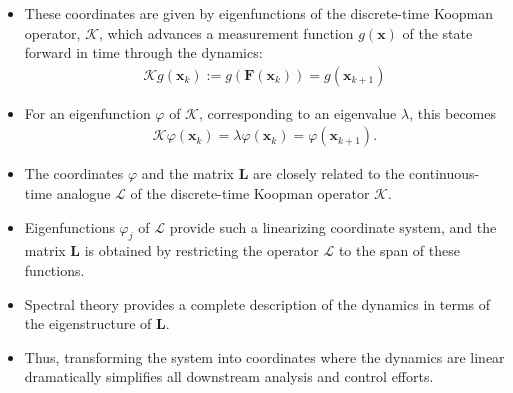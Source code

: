 \documentclass[hyperref={pdfpagemode=FullScreen},aspectratio=169]{beamer}
\begin{document}
\begin{frame}{}
\begin{itemize}
\setlength\itemsep{1em}
\item These coordinates are given by eigenfunctions of the discrete-time Koopman operator, $\mathcal{K}$,  which advances a measurement function $g(\mathbf{x})$ of the state forward in time through the dynamics:
\begin{align}
\mathcal{K}g(\mathbf{x}_k) := g(\mathbf{F}(\mathbf{x}_k)) = g(\mathbf{x}_{k+1})
\end{align}
\item For an eigenfunction $\varphi$ of $\mathcal{K}$, corresponding to an eigenvalue $\lambda$, this becomes
\begin{align}
\mathcal{K}\varphi(\mathbf{x}_k) = \lambda\varphi(\mathbf{x}_k) = \varphi(\mathbf{x}_{k+1}).
\end{align}
\item The coordinates $\varphi$ and the matrix $\mathbf{L}$ are closely related to the continuous-time 
analogue $\mathcal{L}$ of the discrete-time Koopman operator $\mathcal{K}$. 
\item Eigenfunctions $\varphi_j$ of $\mathcal{L}$ provide such a linearizing coordinate system, and the matrix $\mathbf{L}$ is obtained by restricting the operator $\mathcal{L}$ to the span of these functions.
\item Spectral theory provides a complete description of the dynamics in terms of the eigenstructure of $\mathbf{L}$. 
\item Thus, transforming the system into coordinates where the dynamics are linear dramatically simplifies all downstream analysis and control efforts.
\end{itemize}
\end{frame}
\end{document}
